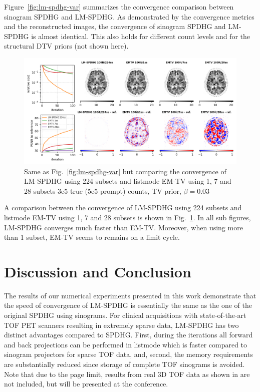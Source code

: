 Figure~\ref{fig:lm-spdhg-var} summarizes the convergence comparison between sinogram SPDHG and 
LM-SPDHG.
As demonstrated by the convergence metrics and the reconstructed images, the convergence of
sinogram SPDHG and LM-SPDHG is almost identical.
This also holds for different count levels and for the structural DTV priors (not shown here).

\begin{figure}
    \centering
    \includegraphics[width=1.0\columnwidth]{./figure4a.png}
    \caption{Same as Fig.~\ref{fig:lm-spdhg-var} but comparing the convergence of LM-SPDHG using
             224 subsets and listmode EM-TV using 1, 7 and 28 subsets 3e5 true (5e5 prompt) counts, TV prior, $\beta = 0.03$}
\label{fig:emtv}
\end{figure}

A comparison between the convergence of LM-SPDHG using 224 subsets and listmode 
EM-TV \cite{Sawatzky2008} using 1, 7 and 28 subsets is shown in Fig.~\ref{fig:emtv}.
In all sub figures, LM-SPDHG converges much faster than EM-TV.
Moreover, when using more than 1 subset, EM-TV seems to remains on a limit cycle.

%
\section{Discussion and Conclusion}

The results of our numerical experiments presented in this work demonstrate that the speed of 
convergence of LM-SPDHG is essentially the same as the one of the original SPDHG using
sinograms.
For clinical acquisitions with state-of-the-art TOF PET scanners resulting in extremely
sparse data, LM-SPDHG has two distinct advantages compared to SPDHG.
First, during the iterations all forward and back projections can be performed in listmode
which is faster compared to sinogram projectors for sparse TOF data, and, 
second, the memory requirements are substantially reduced since storage of complete
TOF sinograms is avoided.
Note that due to the page limit, results from real 3D TOF data as shown in \cite{Schramm2022}
are not included, but will be presented at the conference.
